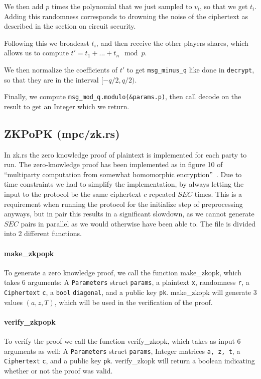 \documentclass[../main.tex]{subfiles}
\begin{document}
We then add $p$ times the polynomial that we just sampled to $v_i$, so that we get $t_i$. Adding this randomness corresponds to drowning the noise of the ciphertext as described in the section on circuit security.

Following this we broadcast $t_i$, and then receive the other players shares, which allows us to compute $t' = t_1 + ... + t_n \mod p$.

We then normalize the coefficients of $t'$ to get \lstinline{msg_minus_q} like done in \lstinline{decrypt}, so that they are in the interval $[-q/2, q/2)$.

Finally, we compute \lstinline{msg_mod_q.modulo(&params.p)}, then call decode on the result to get an Integer which we return.

\subsection{ZKPoPK (mpc/zk.rs)} \label{sec:zkpopk-impl}
In zk.rs the zero knowledge proof of plaintext is implemented for each party to run.
The zero-knowledge proof has been implemented as in figure 10 of ``multiparty computation from somewhat homomorphic encryption''~\cite{damgaard2012multiparty}.
Due to time constraints we had to simplify the implementation, by always letting the input to the protocol be the same ciphertext $c$ repeated $SEC$ times.
This is a requirement when running the protocol for the initialize step of preprocessing anyways, but in pair this results in a significant slowdown, as we cannot generate $SEC$ pairs in parallel as we would otherwise have been able to.
The file is divided into 2 different functions.
\paragraph{make\_zkpopk}
To generate a zero knowledge proof, we call the function make\_zkopk, which takes 6 arguments:
A \lstinline{Parameters} struct \lstinline{params}, a plaintext \lstinline{x}, randomness \lstinline{r}, a \lstinline{Ciphertext} \lstinline{c}, a \lstinline{bool} \lstinline{diagonal}, and a public key \lstinline{pk}.
make\_zkopk will generate 3 values $(a, z, T)$, which will be used in the verification of the proof.

\paragraph{verify\_zkpopk}
To verify the proof we call the function verify\_zkopk, which takes as input 6 arguments as well:
A \lstinline{Parameters} struct \lstinline{params}, Integer matrices \lstinline{a, z, t}, a \lstinline{Ciphertext} \lstinline{c}, and a public key \lstinline{pk}.
verify\_zkopk will return a boolean indicating whether or not the proof was valid.
\end{document}

